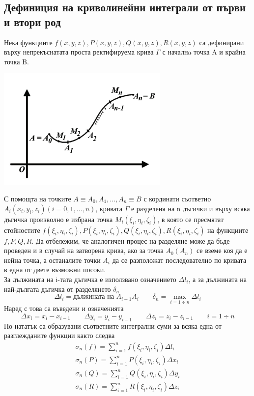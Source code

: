 \documentclass[a4paper,fleqn,12pt]{article}
\theoremstyle{definition}
\begin{document}
\subsection{Дефиниция на криволинейни интеграли от първи и втори род}
Нека функциите $f(x,y,z), P(x,y,z), Q(x,y,z), R(x,y,z)$ са дефинирани върху непрекъснатата проста ректифируема крива $\Gamma$ с началнa точка A и крайна точка B. 
\begin{center}
  \includegraphics{Pics/calc/lec13-1.png}
\end{center}
С помощта на точките $A \equiv A_0, A_1, ..., A_n \equiv B$ с кординати съответно $A_i(x_i,y_i,z_i) (i=0,1,...,n)$, кривата $\Gamma$ е разделеня на n дъгички и върху всяка дъгичка произволно е избрана точка $M_i (\xi_i,\eta_i,\zeta_i)$, в която се пресмятат стойностите $f(\xi_i,\eta_i,\zeta_i), P(\xi_i,\eta_i,\zeta_i), Q(\xi_i,\eta_i,\zeta_i), R(\xi_i,\eta_i,\zeta_i)$ на функциите $f, P, Q, R$. 
Да отбележим, че аналогичен процес на разделяне може да бъде проведен и в случай на затворена крива, ако за точка $A_0 (A_n)$ се вземе коя да е нейна точка, а останалите точки $A_i$ да се разположат последователно по кривата в една от двете възможни посоки. \\
За дължината на i-тата дъгичка е използвано означението $\Delta l_i$, а за дължината на най-дългата дъгичка от разделянето $\delta_n$
$$\Delta l_i = \text{дължината на } A_{i-1} A_i \qquad \delta_n = \max\limits_{i = 1\div n} \Delta l_i$$
Наред с това са въведени и означенията 
$$\Delta x_i = x_i - x_{i-1} \qquad \Delta y_i = y_i - y_{i-1} \qquad \Delta z_i = z_i - z_{i-1} \qquad i = 1 \div n $$
По нататък са образувани съответните интегрални суми за всяка една от разглежданите функции както следва
\begin{gather*}
\sigma_n (f) = \sum_{i=1} ^n f(\xi_i,\eta_i,\zeta_i) \Delta l_i \\
\sigma_n (P) = \sum_{i=1} ^n P(\xi_i,\eta_i,\zeta_i) \Delta x_i  \\
\sigma_n (Q) = \sum_{i=1} ^n Q(\xi_i,\eta_i,\zeta_i) \Delta y_i  \\
\sigma_n (R) = \sum_{i=1} ^n R(\xi_i,\eta_i,\zeta_i) \Delta z_i  \\
\end{gather*}
\end{document}
